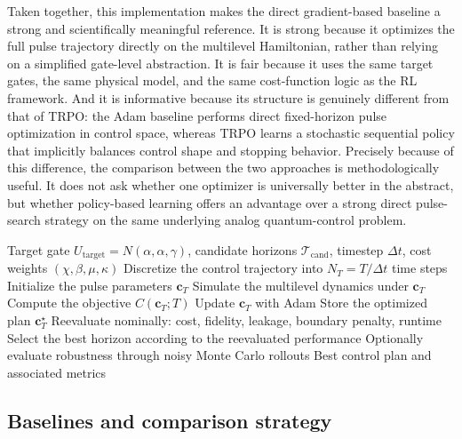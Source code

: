 Taken together, this implementation makes the direct gradient-based baseline a strong and scientifically meaningful reference. It is strong because it optimizes the full pulse trajectory directly on the multilevel Hamiltonian, rather than relying on a simplified gate-level abstraction. It is fair because it uses the same target gates, the same physical model, and the same cost-function logic as the RL framework. And it is informative because its structure is genuinely different from that of TRPO: the Adam baseline performs direct fixed-horizon pulse optimization in control space, whereas TRPO learns a stochastic sequential policy that implicitly balances control shape and stopping behavior. Precisely because of this difference, the comparison between the two approaches is methodologically useful. It does not ask whether one optimizer is universally better in the abstract, but whether policy-based learning offers an advantage over a strong direct pulse-search strategy on the same underlying analog quantum-control problem.

\begin{algorithm}[H]
\caption{Direct gradient-based baseline with horizon sweep}
\label{alg:adam_baseline_horizon_sweep}
\begin{algorithmic}[1]
\Require Target gate \(U_{\mathrm{target}}=N(\alpha,\alpha,\gamma)\), candidate horizons \(\mathcal{T}_{\mathrm{cand}}\), timestep \(\Delta t\), cost weights \((\chi,\beta,\mu,\kappa)\)
    \State Discretize the control trajectory into \(N_T = T/\Delta t\) time steps
    \State Initialize the pulse parameters \(\bm{c}_T\)
        \State Simulate the multilevel dynamics under \(\bm{c}_T\)
        \State Compute the objective \(C(\bm{c}_T;T)\)
        \State Update \(\bm{c}_T\) with Adam
    \EndFor
    \State Store the optimized plan \(\bm{c}_T^{\star}\)
    \State Reevaluate nominally: cost, fidelity, leakage, boundary penalty, runtime
\EndFor
\State Select the best horizon according to the reevaluated performance
\State Optionally evaluate robustness through noisy Monte Carlo rollouts
\State \Return Best control plan and associated metrics
\end{algorithmic}
\end{algorithm}


\subsection{Baselines and comparison strategy}
\label{subsec:baselines_comparison_strategy}

